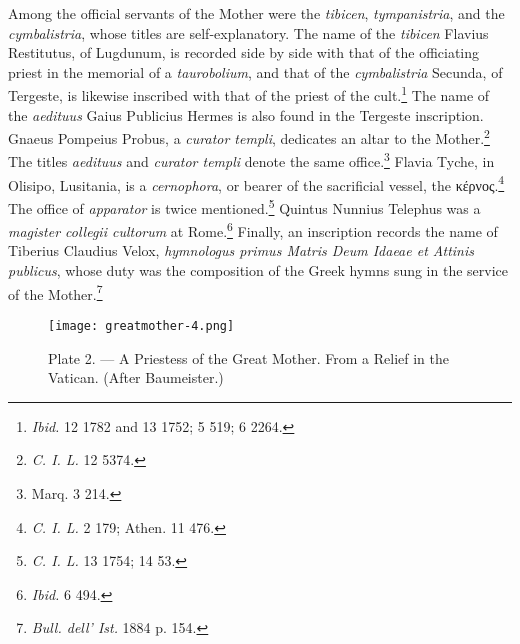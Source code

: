 \documentclass[a4paper, 11pt, oneside, polutonikogreek, english]{article}
\begin{document}
Among the official servants of the Mother were the \emph{tibicen}, \emph{tympanistria}, and the \emph{cymbalistria}, whose titles are self-explanatory. The name of the \emph{tibicen} Flavius Restitutus, of Lugdunum, is recorded side by side with that of the officiating priest in the memorial of a \emph{taurobolium}, and that of the \emph{cymbalistria} Secunda, of Tergeste, is likewise inscribed with that of the priest of the cult.\footnote{\emph{Ibid.} 12 1782 and 13 1752; 5 519; 6 2264.} The name of the \emph{aedituus} Gaius Publicius Hermes is also found in the Tergeste inscription. Gnaeus Pompeius Probus, a \emph{curator templi}, dedicates an altar to the Mother.\footnote{\emph{C. I. L.} 12 5374.} The titles \emph{aedituus} and \emph{curator templi} denote the same office.\footnote{Marq. 3 214.} Flavia Tyche, in Olisipo, Lusitania, is a \emph{cernophora}, or bearer of the sacrificial vessel, the κέρνος.\footnote{\emph{C. I. L.} 2 179; Athen. 11 476.} The office of \emph{apparator} is twice mentioned.\footnote{\emph{C. I. L.} 13 1754; 14 53.} Quintus Nunnius Telephus was a \emph{magister collegii cultorum} at Rome.\footnote{\emph{Ibid.} 6 494.} Finally, an inscription records the name of Tiberius Claudius Velox, \emph{hymnologus primus Matris Deum Idaeae et Attinis publicus}, whose duty was the composition of the Greek hymns sung in the service of the Mother.\footnote{\emph{Bull. dell' Ist.} 1884 p. 154.}

\begin{figure}[H]
\centering
\texttt{[image: greatmother-4.png]}
\caption{Plate 2. --- A Priestess of the Great Mother. From a Relief in the Vatican. (After Baumeister.)}
\end{figure}
\end{document}
